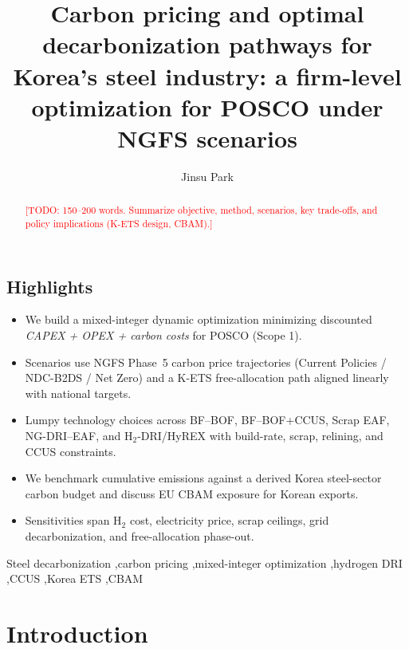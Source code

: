 \documentclass[preprint,5p,authoryear]{elsarticle}
\newcommand{\todo}[1]{\textcolor{red}{[TODO: #1]}}
\begin{document}
\begin{frontmatter}
\title{Carbon pricing and optimal decarbonization pathways for Korea's steel industry: a firm-level optimization for POSCO under NGFS scenarios}

\author[planit]{Jinsu Park}
\address[planit]{PLANiT Institute, Seoul, Republic of Korea}


\section*{Highlights}
\begin{itemize}[leftmargin=*]
  \item We build a mixed-integer dynamic optimization minimizing discounted \emph{CAPEX + OPEX + carbon costs} for POSCO (Scope 1).
  \item Scenarios use NGFS Phase~5 carbon price trajectories (Current Policies / NDC-B2DS / Net Zero) and a K-ETS free-allocation path aligned linearly with national targets.
  \item Lumpy technology choices across BF--BOF, BF--BOF+CCUS, Scrap EAF, NG-DRI--EAF, and H$_2$-DRI/HyREX with build-rate, scrap, relining, and CCUS constraints.
  \item We benchmark cumulative emissions against a derived Korea steel-sector carbon budget and discuss EU CBAM exposure for Korean exports.
  \item Sensitivities span H$_2$ cost, electricity price, scrap ceilings, grid decarbonization, and free-allocation phase-out.
\end{itemize}

\begin{abstract}
\todo{150--200 words. Summarize objective, method, scenarios, key trade-offs, and policy implications (K-ETS design, CBAM).}
\end{abstract}

\begin{keyword}
Steel decarbonization \sep carbon pricing \sep mixed-integer optimization \sep hydrogen DRI \sep CCUS \sep Korea ETS \sep CBAM
\end{keyword}
\end{frontmatter}

\section{Introduction}
\end{document}

